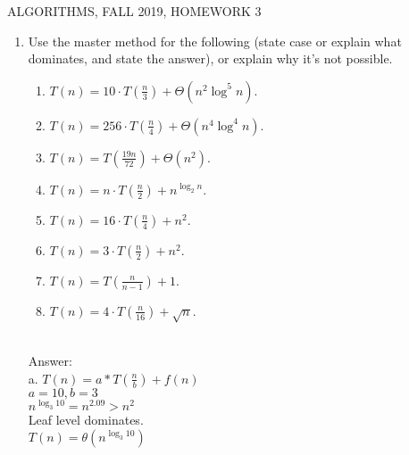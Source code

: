 \documentclass[12pt]{article}
\begin{document}
  
\pagestyle{empty}
 
\begin{center} ALGORITHMS,  FALL 2019, HOMEWORK 3
\end{center}



 
\begin{enumerate}
 \item Use the master method for the following (state case or explain what dominates, and state the answer), or explain why it's not possible. 
\begin{enumerate}

\itemsep-0.35cm

\item  $T(n)=10\cdot T(\frac{n}{3}) + \Theta(n^2\log^5 n)$.\\
 
  \item  $T(n) = 256\cdot T(\frac{n}{4}) + \Theta(n^4\log^4 n)$. \\

\item $T(n) = T(\frac{19n}{72}) + \Theta(n^2)$.\\



\item $T(n) = n\cdot T(\frac{n}{2}) + n^{\log_2 n}$.\\

 \item  $T(n) =   16\cdot T(\frac{n}{4}) + n^2$.  \\

  \item  $T(n) =  3\cdot T(\frac{n}{2}) + n^2$.\\

 
  
 \item $T(n) =   T(\frac{n}{n{-}1}) + 1$.\\


 
\item  $T(n) =  4\cdot T(\frac{n}{16}) + \sqrt{n}$. \\\\

\end{enumerate}

{ \color{blue} Answer: \\
a. $T(n) = a*T(\frac{n}{b}) + f(n)$ \\
$a = 10, b = 3$ \\
$n^{\log_3 10} = n^{2.09}  >  n^2$ \\
Leaf level dominates. \\
$ T(n) = \theta(n^{\log_3 10})$ \\ \\

}
\end{enumerate}
\end{document}
